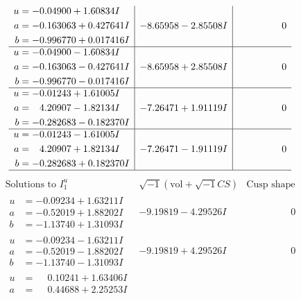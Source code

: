 \documentclass[1p]{elsarticle_modified}
\theoremstyle{definition}
\newcommand{\I}{\sqrt{-1}}
\begin{document}
$$\begin{array}{c|c|c}
\begin{aligned}
u &= -0.04900 + 1.60834 I \\
a &= -0.163063 + 0.427641 I \\
b &= -0.996770 + 0.017416 I\end{aligned}
 & -8.65958 - 2.85508 I & \phantom{-0.000000 } 0 \\ \hline\begin{aligned}
u &= -0.04900 - 1.60834 I \\
a &= -0.163063 - 0.427641 I \\
b &= -0.996770 - 0.017416 I\end{aligned}
 & -8.65958 + 2.85508 I & \phantom{-0.000000 } 0 \\ \hline\begin{aligned}
u &= -0.01243 + 1.61005 I \\
a &= \phantom{-}4.20907 - 1.82134 I \\
b &= -0.282683 - 0.182370 I\end{aligned}
 & -7.26471 + 1.91119 I & \phantom{-0.000000 } 0 \\ \hline\begin{aligned}
u &= -0.01243 - 1.61005 I \\
a &= \phantom{-}4.20907 + 1.82134 I \\
b &= -0.282683 + 0.182370 I\end{aligned}
 & -7.26471 - 1.91119 I & \phantom{-0.000000 } 0\\
 \hline 
 \end{array}$$\newpage$$\begin{array}{c|c|c}  
\text{Solutions to }I^u_{1}& \I (\text{vol} + \sqrt{-1}CS) & \text{Cusp shape}\\
 \hline 
\begin{aligned}
u &= -0.09234 + 1.63211 I \\
a &= -0.52019 + 1.88202 I \\
b &= -1.13740 + 1.31093 I\end{aligned}
 & -9.19819 - 4.29526 I & \phantom{-0.000000 } 0 \\ \hline\begin{aligned}
u &= -0.09234 - 1.63211 I \\
a &= -0.52019 - 1.88202 I \\
b &= -1.13740 - 1.31093 I\end{aligned}
 & -9.19819 + 4.29526 I & \phantom{-0.000000 } 0 \\ \hline\begin{aligned}
u &= \phantom{-}0.10241 + 1.63406 I \\
a &= \phantom{-}0.44688 + 2.25253 I \\

\end{aligned}
\end{array}$$
\end{document}
